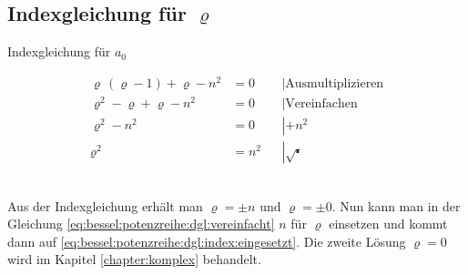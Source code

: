 \subsection*{Indexgleichung f\"ur $\varrho$}
\begin{normalsize}
	Indexgleichung f\"ur $a_0$
\end{normalsize}
\begin{align*}
	\varrho \, \left( \varrho -1 \right) + \varrho - n^2 &= 0 && \left| \text{Ausmultiplizieren} \right. \\
	\varrho ^2 - \varrho + \varrho -n^2 &= 0 && \left| \text{Vereinfachen} \right.\\
	\varrho ^2 - n^2 &= 0 && \left| +n^2 \right.\\
	\varrho ^2 &= n^2 && \left| \sqrt{\centerdot} \right.
\end{align*}
\\
\begin{normalsize}
	Aus der Indexgleichung erh\"alt man $\varrho = \pm n$ und $\varrho = \pm 0 $.
	Nun kann man in der Gleichung \ref{eq:bessel:potenzreihe:dgl:vereinfacht} $n$ f\"ur $\varrho$ einsetzen und kommt dann auf \ref{eq:bessel:potenzreihe:dgl:index:eingesetzt}.
	Die zweite L\"osung $\varrho = 0$ wird im Kapitel \ref{chapter:komplex} behandelt.
\end{normalsize}


